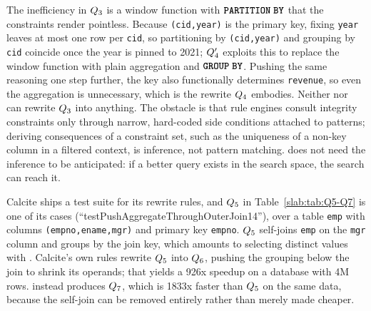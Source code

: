 The inefficiency in $Q_3$ is a window function with
$\sqlpartitionbycolor$ that the constraints render pointless. Because
\texttt{(cid,year)} is the primary key, fixing \texttt{year} leaves
at most one row per \texttt{cid}, so partitioning by
\texttt{(cid,year)} and grouping by \texttt{cid} coincide once the
year is pinned to 2021; $Q'_4$ exploits this to replace the
window function with plain aggregation and ${\color{black}{{\textbf{\texttt{GROUP}}\;\textbf{\texttt{BY}}}}}$.
Pushing the same reasoning one step further, the key also functionally
determines \texttt{revenue}, so even the aggregation is unnecessary,
which is the rewrite $Q_4$ embodies. Neither \LR nor \WT can
rewrite $Q_3$ into anything. The obstacle is that rule engines
consult integrity constraints only through narrow, hard-coded side
conditions attached to patterns; deriving consequences of a constraint
set, such as the uniqueness of a non-key column in a filtered context,
is inference, not pattern matching. \slabcity does not need the
inference to be anticipated: if a better query exists in the search
space, the search can reach it. 



Calcite ships a test suite for its rewrite rules, and $Q_5$ in
Table~\ref{slab:tab:Q5-Q7} is one of its cases
(``testPushAggregateThroughOuterJoin14''), over a table \texttt{emp}
with columns \texttt{(empno,ename,mgr)} and primary key
\texttt{empno}. $Q_5$ self-joins \texttt{emp} on the
\texttt{mgr} column and groups by the join key, which amounts to
selecting distinct values with \sqldistinctcolor. Calcite's own rules
rewrite $Q_5$ into $Q_6$, pushing the grouping below the
join to shrink its operands; that yields a 926x speedup on a database
with 4M rows. \slabcity instead produces $Q_7$, which is 1833x
faster than $Q_5$ on the same data, because the self-join can be
removed entirely rather than merely made cheaper. 


